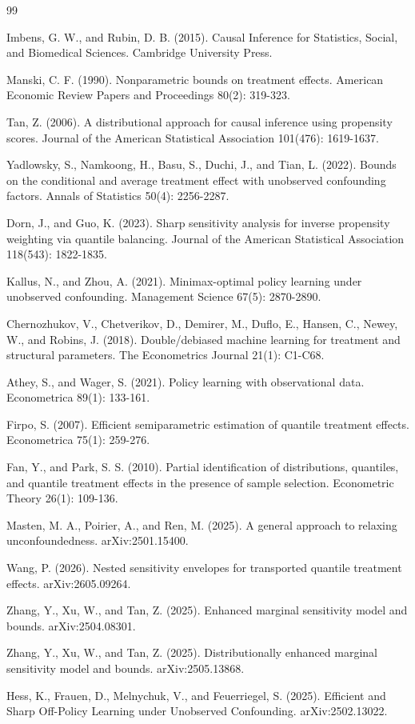 \documentclass{article}
\begin{document}
\begin{thebibliography}{99}

   Imbens, G. W., and Rubin, D. B. (2015). Causal Inference for Statistics, Social, and Biomedical Sciences. Cambridge University Press.

   Manski, C. F. (1990). Nonparametric bounds on treatment effects. American Economic Review Papers and Proceedings 80(2): 319-323.

   Tan, Z. (2006). A distributional approach for causal inference using propensity scores. Journal of the American Statistical Association 101(476): 1619-1637.

   Yadlowsky, S., Namkoong, H., Basu, S., Duchi, J., and Tian, L. (2022). Bounds on the conditional and average treatment effect with unobserved confounding factors. Annals of Statistics 50(4): 2256-2287.

   Dorn, J., and Guo, K. (2023). Sharp sensitivity analysis for inverse propensity weighting via quantile balancing. Journal of the American Statistical Association 118(543): 1822-1835.

   Kallus, N., and Zhou, A. (2021). Minimax-optimal policy learning under unobserved confounding. Management Science 67(5): 2870-2890.

   Chernozhukov, V., Chetverikov, D., Demirer, M., Duflo, E., Hansen, C., Newey, W., and Robins, J. (2018). Double/debiased machine learning for treatment and structural parameters. The Econometrics Journal 21(1): C1-C68.

   Athey, S., and Wager, S. (2021). Policy learning with observational data. Econometrica 89(1): 133-161.

   Firpo, S. (2007). Efficient semiparametric estimation of quantile treatment effects. Econometrica 75(1): 259-276.

   Fan, Y., and Park, S. S. (2010). Partial identification of distributions, quantiles, and quantile treatment effects in the presence of sample selection. Econometric Theory 26(1): 109-136.

   Masten, M. A., Poirier, A., and Ren, M. (2025). A general approach to relaxing unconfoundedness. arXiv:2501.15400.

   Wang, P. (2026). Nested sensitivity envelopes for transported quantile treatment effects. arXiv:2605.09264.

   Zhang, Y., Xu, W., and Tan, Z. (2025). Enhanced marginal sensitivity model and bounds. arXiv:2504.08301.

   Zhang, Y., Xu, W., and Tan, Z. (2025). Distributionally enhanced marginal sensitivity model and bounds. arXiv:2505.13868.

   Hess, K., Frauen, D., Melnychuk, V., and Feuerriegel, S. (2025). Efficient and Sharp Off-Policy Learning under Unobserved Confounding. arXiv:2502.13022.

\end{thebibliography}
\end{document}
